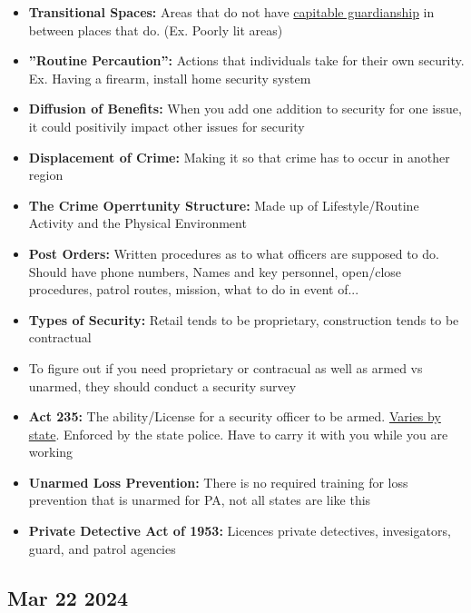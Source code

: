 \documentclass[12pt]{article}
\begin{document}
\begin{itemize}
		  \item \textbf{Transitional Spaces:} Areas that do not have \underline{capitable 
					guardianship} in between places that do. (Ex. Poorly lit areas)
		  \item \textbf{''Routine Percaution'':} Actions that individuals take for their own
		 			security. Ex. Having a firearm, install home security system	
		  \item \textbf{Diffusion of Benefits:} When you add one addition to security for one 
		  			issue, it could positivily impact other issues for security
		  \item \textbf{Displacement of Crime:} Making it so that crime has to occur in another
		  			region
		  \item \textbf{The Crime Operrtunity Structure:} Made up of Lifestyle/Routine Activity and the Physical Environment
		  \item \textbf{Post Orders:} Written procedures as to what officers are supposed to do. Should have phone numbers,
		  			Names and key personnel, open/close procedures, patrol routes, mission, what to do in event of...
		  \item \textbf{Types of Security:} Retail tends to be proprietary, construction tends to be contractual
		  \item To figure out if you need proprietary or contracual as well as armed vs unarmed, they should conduct a
		  			security survey
		  \item \textbf{Act 235:} The ability/License for a security officer to be armed. \underline{Varies by state}. 
		  			Enforced by the state police. Have to carry it with you while you are working
		  \item \textbf{Unarmed Loss Prevention:} There is no required training for loss prevention that is unarmed for PA, not
		  			all states are like this
		  \item \textbf{Private Detective Act of 1953:} Licences private detectives, invesigators, guard, and patrol agencies
\end{itemize}

\subsection*{Mar 22 2024}
\end{document}
